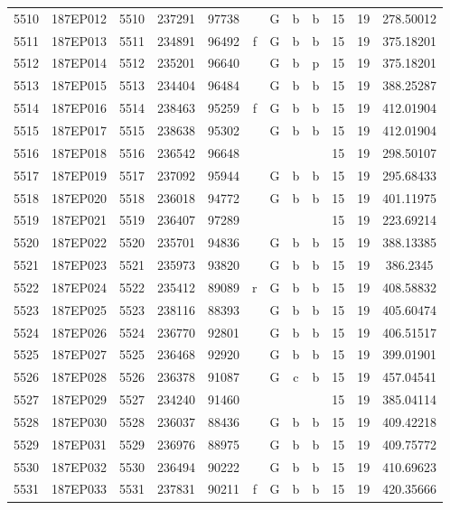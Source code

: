 \begin{tabular}{|*{12}{c|}}
5510 & 187EP012 & 5510 & 237291 & 97738 &  & G & b & b & 15 & 19 & 278.50012 \\ 
5511 & 187EP013 & 5511 & 234891 & 96492 & f & G & b & b & 15 & 19 & 375.18201 \\ 
5512 & 187EP014 & 5512 & 235201 & 96640 &  & G & b & p & 15 & 19 & 375.18201 \\ 
5513 & 187EP015 & 5513 & 234404 & 96484 &  & G & b & b & 15 & 19 & 388.25287 \\ 
5514 & 187EP016 & 5514 & 238463 & 95259 & f & G & b & b & 15 & 19 & 412.01904 \\ 
5515 & 187EP017 & 5515 & 238638 & 95302 &  & G & b & b & 15 & 19 & 412.01904 \\ 
5516 & 187EP018 & 5516 & 236542 & 96648 &  &  &  &  & 15 & 19 & 298.50107 \\ 
5517 & 187EP019 & 5517 & 237092 & 95944 &  & G & b & b & 15 & 19 & 295.68433 \\ 
5518 & 187EP020 & 5518 & 236018 & 94772 &  & G & b & b & 15 & 19 & 401.11975 \\ 
5519 & 187EP021 & 5519 & 236407 & 97289 &  &  &  &  & 15 & 19 & 223.69214 \\ 
5520 & 187EP022 & 5520 & 235701 & 94836 &  & G & b & b & 15 & 19 & 388.13385 \\ 
5521 & 187EP023 & 5521 & 235973 & 93820 &  & G & b & b & 15 & 19 & 386.2345 \\ 
5522 & 187EP024 & 5522 & 235412 & 89089 & r & G & b & b & 15 & 19 & 408.58832 \\ 
5523 & 187EP025 & 5523 & 238116 & 88393 &  & G & b & b & 15 & 19 & 405.60474 \\ 
5524 & 187EP026 & 5524 & 236770 & 92801 &  & G & b & b & 15 & 19 & 406.51517 \\ 
5525 & 187EP027 & 5525 & 236468 & 92920 &  & G & b & b & 15 & 19 & 399.01901 \\ 
5526 & 187EP028 & 5526 & 236378 & 91087 &  & G & c & b & 15 & 19 & 457.04541 \\ 
5527 & 187EP029 & 5527 & 234240 & 91460 &  &  &  &  & 15 & 19 & 385.04114 \\ 
5528 & 187EP030 & 5528 & 236037 & 88436 &  & G & b & b & 15 & 19 & 409.42218 \\ 
5529 & 187EP031 & 5529 & 236976 & 88975 &  & G & b & b & 15 & 19 & 409.75772 \\ 
5530 & 187EP032 & 5530 & 236494 & 90222 &  & G & b & b & 15 & 19 & 410.69623 \\ 
5531 & 187EP033 & 5531 & 237831 & 90211 & f & G & b & b & 15 & 19 & 420.35666 \\ 

\end{tabular}
